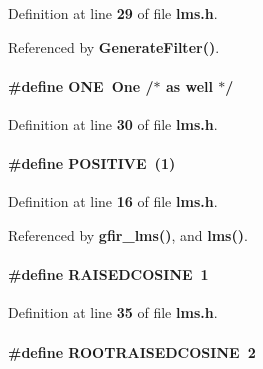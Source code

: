 Definition at line {\bf 29} of file {\bf lms.\+h}.



Referenced by {\bf Generate\+Filter()}.

\paragraph[{O\+NE}]{\setlength{\rightskip}{0pt plus 5cm}\#define O\+NE~{\bf One}		/$\ast$ as well $\ast$/}\label{lms_8h_a206b6f5362e56b51ca957635350b70b6}


Definition at line {\bf 30} of file {\bf lms.\+h}.

\paragraph[{P\+O\+S\+I\+T\+I\+VE}]{\setlength{\rightskip}{0pt plus 5cm}\#define P\+O\+S\+I\+T\+I\+VE~(1)}\label{lms_8h_aefb7723e1092c450754ef6c07922b1bf}


Definition at line {\bf 16} of file {\bf lms.\+h}.



Referenced by {\bf gfir\+\_\+lms()}, and {\bf lms()}.

\paragraph[{R\+A\+I\+S\+E\+D\+C\+O\+S\+I\+NE}]{\setlength{\rightskip}{0pt plus 5cm}\#define R\+A\+I\+S\+E\+D\+C\+O\+S\+I\+NE~1}\label{lms_8h_aad132a516e77ed236f2fc783d4a0a76a}


Definition at line {\bf 35} of file {\bf lms.\+h}.

\paragraph[{R\+O\+O\+T\+R\+A\+I\+S\+E\+D\+C\+O\+S\+I\+NE}]{\setlength{\rightskip}{0pt plus 5cm}\#define R\+O\+O\+T\+R\+A\+I\+S\+E\+D\+C\+O\+S\+I\+NE~2}\label{lms_8h_a4ba2a9817add5208b622d41961322327}


